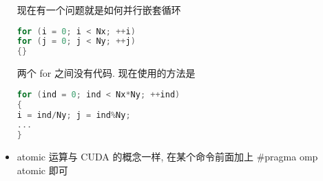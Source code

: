 \begin{itemize}
现在有一个问题就是如何并行嵌套循环
\begin{lstlisting}[language=cpp]
for (i = 0; i < Nx; ++i)
for (j = 0; j < Ny; ++j)
{}
\end{lstlisting}
两个 for 之间没有代码. 现在使用的方法是
\begin{lstlisting}[language=cpp]
for (ind = 0; ind < Nx*Ny; ++ind)
{
i = ind/Ny; j = ind%Ny;
...
}
\end{lstlisting}
\item atomic 运算与 CUDA 的概念一样, 在某个命令前面加上
#pragma omp atomic
即可
\end{itemize}
